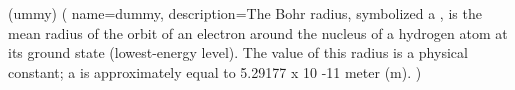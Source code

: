 \newglossaryentry(ummy)
(
     name=dummy,
     description={The Bohr radius, symbolized a , is the mean radius of the orbit of an electron around the nucleus of a hydrogen atom at its ground state (lowest-energy level). The value of this radius is a physical constant; a is approximately equal to 5.29177 x 10 -11 meter (m).}
     )
